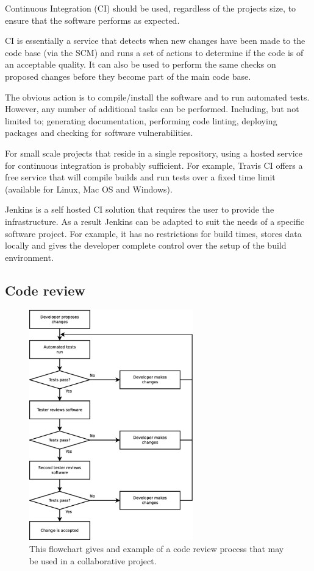 \documentclass[jnr]{iosart2x}
\begin{document}
\begin{itemzie}
Continuous Integration (CI) should be used, regardless of the projects size, to ensure that the software performs as expected.

CI is essentially a service that detects when new changes have been made to the code base (via the SCM) and runs a set of actions to determine if the code is of an acceptable quality.
It can also be used to perform the same checks on proposed changes before they become part of the main code base.

The obvious action is to compile/install the software and to run automated tests.
However, any number of additional tasks can be performed.
Including, but not limited to; generating documentation, performing code linting, deploying packages and checking for software vulnerabilities.

For small scale projects that reside in a single repository, using a hosted service for continuous integration is probably sufficient.
For example, Travis CI \cite{Travis_CI} offers a free service that will compile builds and run tests over a fixed time limit (available for Linux, Mac OS and Windows).

Jenkins \cite{Jenkins} is a self hosted CI solution that requires the user to provide the infrastructure.
As a result Jenkins can be adapted to suit the needs of a specific software project.
For example, it has no restrictions for build times, stores data locally and gives the developer complete control over the setup of the build environment.

\subsection{Code review}
\label{Code review}

\begin{figure}
    \centering
    \includegraphics[height=10cm]{code_review_process.eps}
    \caption{This flowchart gives and example of a code review process that may be used in a collaborative project.}
    \label{Code_Review_Process}
\end{figure}


\end{itemzie}
\end{document}
